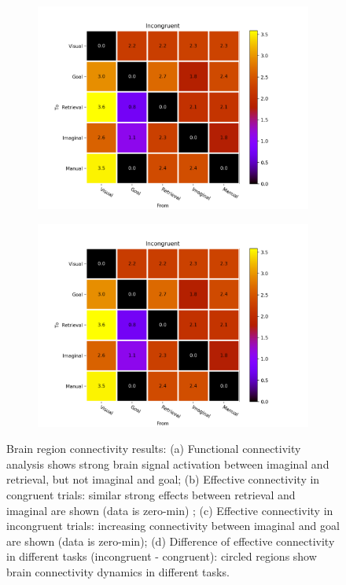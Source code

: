 \documentclass[10pt,letterpaper]{article}
\begin{document}
\begin{figure}[ht]
\begin{subfigure}{.5\textwidth}
  \includegraphics[width=\linewidth]{Incongruent_effect_conn.png}
  \caption{}
\end{subfigure}%
\begin{subfigure}{.5\textwidth}
  \centering
  \includegraphics[width=\linewidth]{Incongruent_effect_conn.png}
  \caption{}
\end{subfigure}
\caption{Brain region connectivity results: (a) Functional connectivity analysis shows strong brain signal activation between imaginal and retrieval, but not imaginal and goal; (b) Effective connectivity in congruent trials: similar strong effects between retrieval and imaginal are shown (data is zero-min) ; (c) Effective connectivity in incongruent trials: increasing connectivity between imaginal and goal are shown (data is zero-min); (d) Difference of effective connectivity in different tasks (incongruent - congruent): circled regions show brain connectivity dynamics in different tasks.}
\label{fig:conn}
\end{figure}
\end{document}
